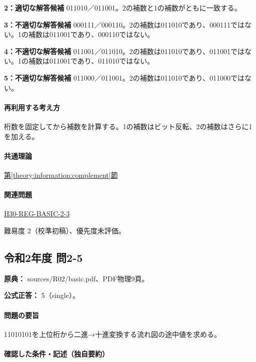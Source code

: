 \noindent\textbf{2：適切な解答候補} 011010／011001。2の補数と1の補数がともに一致する。\par

\noindent\textbf{3：不適切な解答候補} 000111／000110。2の補数は011010であり、000111ではない。1の補数は011001であり、000110ではない。\par

\noindent\textbf{4：不適切な解答候補} 011001／011010。2の補数は011010であり、011001ではない。1の補数は011001であり、011010ではない。\par

\noindent\textbf{5：不適切な解答候補} 011000／011001。2の補数は011010であり、011000ではない。\par

\paragraph{再利用する考え方} 桁数を固定してから補数を計算する。1の補数はビット反転、2の補数はさらに1を加える。

\paragraph{共通理論} \hyperref[theory:information:complement]{第\ref*{theory:information:complement}節}

\paragraph{関連問題} \hyperref[q:h30-reg-basic-2-3]{H30-REG-BASIC-2-3}

\par 難易度 2（校準初稿）、優先度未評価。

\subsection{令和2年度 問2-5}
\label{q:r02-reg-basic-2-5}

\noindent\textbf{原典：} sources/R02/basic.pdf、PDF物理9頁。

\textbf{公式正答：} 5（single）。

\paragraph{問題の要旨} 11010101を上位桁から二進→十進変換する流れ図の途中値を求める。

\paragraph{確認した条件・記述（独自要約）}\mbox{}\par

